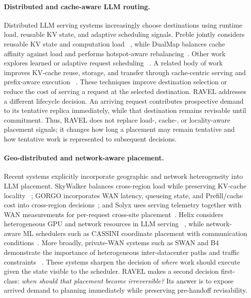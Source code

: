 \documentclass[letterpaper,twocolumn,10pt]{article}
\begin{document}
\paragraph{Distributed and cache-aware LLM routing.}
Distributed LLM serving systems increasingly choose destinations using runtime
load, reusable KV state, and adaptive scheduling signals.
Preble jointly considers reusable KV state and computation load
~\cite{preble}, while DualMap balances cache affinity against load and performs
hotspot-aware rebalancing~\cite{dualmap}.
Other work explores learned or adaptive request scheduling
~\cite{llm_learning_to_rank,simple_is_better,lodestar}.
A related body of work improves KV-cache reuse, storage, and transfer through
cache-centric serving and prefix-aware execution
~\cite{mooncake,cachedattention,infinigen,cachecraft,chunkattention,
cacheblend,kvlink}.
These techniques improve destination selection or reduce the cost of serving a
request at the selected destination.
RAVEL addresses a different lifecycle decision.
An arriving request contributes prospective demand to its tentative replica
immediately, while that destination remains revisable until commitment.
Thus, RAVEL does not replace load-, cache-, or locality-aware placement signals;
it changes how long a placement may remain tentative and how tentative work is
represented to subsequent decisions.

\paragraph{Geo-distributed and network-aware placement.}
Recent systems explicitly incorporate geographic and network heterogeneity into
LLM placement.
SkyWalker balances cross-region load while preserving KV-cache locality
~\cite{skylb}; GORGO incorporates WAN latency, queueing state, and
Prefill/cache cost into cross-region decisions~\cite{gorgo}; and Solyx uses
serving telemetry together with WAN measurements for per-request cross-site
placement~\cite{solyx}.
Helix considers heterogeneous GPU and network resources in LLM serving
~\cite{helix}, while network-aware ML schedulers such as CASSINI coordinate
placement with communication conditions~\cite{cassini}.
More broadly, private-WAN systems such as SWAN and B4 demonstrate the
importance of heterogeneous inter-datacenter paths and traffic constraints
~\cite{swan,b4}.
These systems sharpen the decision of \emph{where} work should execute given
the state visible to the scheduler.
RAVEL makes a second decision first-class:
\emph{when should that placement become irreversible?}
Its answer is to expose arrived demand to planning immediately while preserving
pre-handoff revisability.
\end{document}
